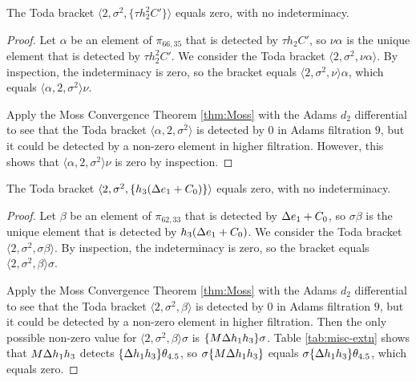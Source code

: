 \begin{lemma}
\label{lem:2,sigma^2,th2^2C'}
The Toda bracket $\langle 2, \sigma^2, \{\tau h_2^2 C'\} \rangle$
equals zero, with no indeterminacy.
\end{lemma}

\begin{proof}
Let $\alpha$ be an element of $\pi_{66,35}$ that is detected by
$\tau h_2 C'$, so $\nu \alpha$ is the unique element
that is detected by $\tau h_2^2 C'$.
We consider the Toda bracket
$\langle 2, \sigma^2, \nu \alpha \rangle$.
By inspection, the indeterminacy is zero, so
the bracket equals
$\langle 2, \sigma^2, \nu \rangle \alpha$, which equals
$\langle \alpha, 2, \sigma^2 \rangle \nu$.

Apply the Moss Convergence Theorem \ref{thm:Moss}
with the Adams $d_2$ differential to see
that the Toda bracket $\langle \alpha, 2, \sigma^2 \rangle$
is detected by $0$ in Adams filtration $9$, but it could be detected
by a non-zero element in higher filtration.  However, this shows
that $\langle \alpha, 2, \sigma^2 \rangle \nu$ is zero by inspection.
\end{proof}

\begin{lemma}
\label{lem:2,sigma^2,h3(De1+C0)}
The Toda bracket $\langle 2, \sigma^2, \{h_3(\Delta e_1 + C_0)\} \rangle$
equals zero, with no indeterminacy.
\end{lemma}

\begin{proof}
Let $\beta$ be an element of $\pi_{62,33}$ that is detected by
$\Delta e_1 + C_0$, so $\sigma \beta$ is the unique element that is
detected by $h_3(\Delta e_1 + C_0)$.
We consider the Toda bracket
$\langle 2, \sigma^2, \sigma \beta \rangle$.
By inspection, the indeterminacy is zero, so
the bracket equals
$\langle 2, \sigma^2, \beta \rangle \sigma$.

Apply the Moss Convergence Theorem \ref{thm:Moss} 
with the Adams $d_2$ differential to see that the Toda bracket
$\langle 2, \sigma^2, \beta \rangle$ is detected by $0$ in 
Adams filtration $9$, but it could be detected by a non-zero
element in higher filtration. 
Then the only possible non-zero value for
$\langle 2, \sigma^2, \beta \rangle \sigma$ is
$\{M \Delta h_1 h_3\} \sigma$.
Table \ref{tab:misc-extn} shows that $M \Delta h_1 h_3$ detects
$\{\Delta h_1 h_3\} \theta_{4.5}$, so
$\sigma \{M \Delta h_1 h_3\}$ equals $\sigma \{\Delta h_1 h_3\} \theta_{4.5}$,
which equals zero.
\end{proof}

